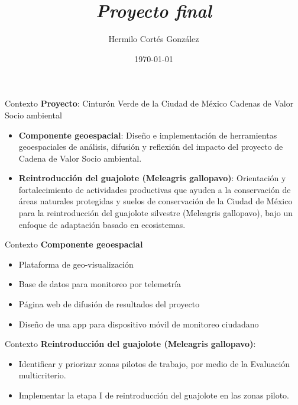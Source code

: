 \documentclass[11pt]{beamer}
\author[]{Hermilo Cortés González}
\title[]{
	\textit{Proyecto final}}
\institute[]{ \textbf{Clase}: Ecología del Movimiento \\ \textbf{Profesor}: Antonio de la Torre\\Posgrado en Ciencias Biológicas,UNAM }
\date{\today}
\begin{document}
\begin{frame}
\titlepage
\end{frame}


\begin{frame}{Contexto}\small
\textbf{Proyecto}: Cinturón Verde de la Ciudad de México Cadenas de Valor Socio ambiental

	\begin{itemize}
		\item \textbf{Componente geoespacial}: Diseño e implementación de herramientas geoespaciales de análisis, difusión y reflexión del impacto del proyecto de Cadena de Valor Socio ambiental. 
		\item \textbf{Reintroducción del guajolote (Meleagris gallopavo)}: Orientación y fortalecimiento de actividades productivas que ayuden a la conservación de áreas naturales protegidas y suelos de conservación de la Ciudad de México para la reintroducción del guajolote silvestre (Meleagris gallopavo), bajo un enfoque de adaptación basado en ecosistemas. 
	\end{itemize}

\end{frame}

\begin{frame}{Contexto}
\textbf{Componente geoespacial}

	\begin{itemize}
		\item Plataforma de geo-visualización
		\item Base de datos para monitoreo por telemetría
		\item Página web de difusión de resultados del proyecto
		\item Diseño de una app para dispositivo móvil de monitoreo ciudadano
	\end{itemize}
\end{frame}

\begin{frame}{Contexto}
\textbf{Reintroducción del guajolote (Meleagris gallopavo)}:
	\begin{itemize}
		\item Identificar y priorizar zonas pilotos de trabajo, por medio de la Evaluación multicriterio.
		\item Implementar la etapa I de reintroducción del guajolote en las zonas piloto.
	\end{itemize}
\end{frame}
\end{document}
